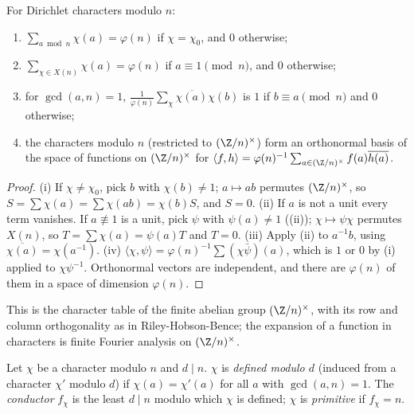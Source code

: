 \begin{theorem}[orthogonality]\label{thm:rings:orthogonality}
For Dirichlet characters modulo $n$:
\begin{enumerate}[label=(\roman*)]
\item $\sum_{a\bmod n}\chi(a)=\varphi(n)$ if $\chi=\chi_0$, and $0$ otherwise;
\item $\sum_{\chi\in X(n)}\chi(a)=\varphi(n)$ if $a\equiv1\pmod n$, and $0$ otherwise;
\item for $\gcd(a,n)=1$, $\frac1{\varphi(n)}\sum_\chi\overline{\chi(a)}\chi(b)$ is $1$ if $b\equiv a\pmod n$ and $0$ otherwise;
\item the characters modulo $n$ (restricted to $(\Z/n)^\times$) form an orthonormal basis of the space of functions on $(\Z/n)^\times$ for
$\langle f,h\rangle=\varphi(n)^{-1}\sum_{a\in(\Z/n)^\times}f(a)\overline{h(a)}$.
\end{enumerate}
\end{theorem}

\begin{proof}
(i) If $\chi\ne\chi_0$, pick $b$ with $\chi(b)\ne1$; $a\mapsto ab$ permutes $(\Z/n)^\times$, so $S=\sum\chi(a)=\sum\chi(ab)=\chi(b)S$, and $S=0$. (ii) If $a$ is not a
unit every term vanishes. If $a\not\equiv1$ is a unit, pick $\psi$ with $\psi(a)\ne1$ ((ii)); $\chi\mapsto\psi\chi$ permutes $X(n)$, so
$T=\sum\chi(a)=\psi(a)T$ and $T=0$. (iii) Apply (ii) to $a^{-1}b$, using $\overline{\chi(a)}=\chi(a^{-1})$. (iv) $\langle\chi,\psi\rangle=\varphi(n)^{-1}\sum(\chi\bar\psi)(a)$, which is $1$ or
$0$ by (i) applied to $\chi\psi^{-1}$. Orthonormal vectors are independent, and there are $\varphi(n)$ of them in a space of dimension $\varphi(n)$.
\end{proof}

This is the character table of the finite abelian group $(\Z/n)^\times$, with its row and column orthogonality as in
Riley-Hobson-Bence; the expansion of a function in characters is finite Fourier analysis on $(\Z/n)^\times$.

\begin{definition}\label{def:rings:conductor}
Let $\chi$ be a character modulo $n$ and $d\mid n$. $\chi$ is \emph{defined modulo $d$} (induced from a character $\chi'$ modulo $d$) if $\chi(a)=\chi'(a)$ for
all $a$ with $\gcd(a,n)=1$. The \emph{conductor} $f_\chi$ is the least $d\mid n$ modulo which $\chi$ is defined; $\chi$ is \emph{primitive} if $f_\chi=n$.
\end{definition}

